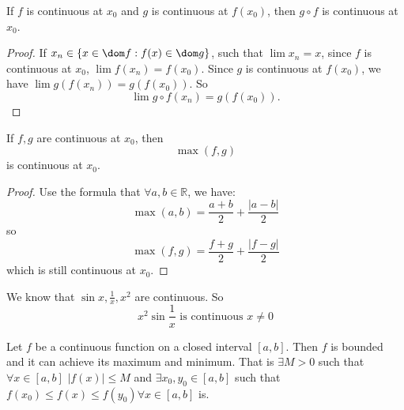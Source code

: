 \documentclass{report}
\begin{document}
\begin{theorem}{}
    If $f$ is continuous at $x_{0}$ and $g$ is continuous at $f(x_{0})$, then $g \circ f$ is continuous at $x_{0}$.
\end{theorem}
    \begin{proof}
        If $x_{n} \in \{x \in \dom f: f(x) \in \dom g\}$, such that $\lim  x_{n} = x$, since $f$ is continuous at $x_{0}$, $\lim f(x_{n}) = f(x_{0})$. Since $g$ is continuous at $f(x_{0})$, we have $\lim g(f(x_{n})) = g(f(x_{0}))$. So 
            \begin{equation*}
                \lim g \circ f(x_{n}) = g(f(x_{0})).
            \end{equation*}
    \end{proof}

\begin{examples}
    \begin{example}
        If $f, g$ are continuous at $x_{0}$, then
            \begin{equation*}
                \max(f, g)
            \end{equation*}
        is continuous at $x_{0}$.
            \begin{proof}
                Use the formula that $\forall a, b \in \mathbb{R}$, we have:
                    \begin{equation*}
                        \max(a, b) = \dfrac{a + b}{2} + \dfrac{\lvert a - b \rvert}{2}
                    \end{equation*}
                so
                    \begin{equation*}
                        \max(f, g) = \dfrac{f + g}{2} + \dfrac{\lvert f - g \rvert}{2}
                    \end{equation*}
                which is still continuous at $x_{0}$.
            \end{proof}
    \end{example}
    \begin{example}
        We know that $\sin{x}, \frac{1}{x}, x^{2}$ are continuous. So
            \begin{equation*}
                x^{2}\sin{\dfrac{1}{x}} \text{ is continuous $x \neq 0$}
            \end{equation*}
    \end{example}
\end{examples}

\begin{theorem}{18.1}
    Let $f$ be a continuous function on a closed interval $[a, b]$. Then $f$ is bounded and it can achieve its maximum and minimum. That is $\exists M> 0$ such that $\forall x \in [a, b]$ $\lvert f(x) \rvert \leq M$ and $\exists x_{0}, y_{0} \in [a, b]$ such that $f(x_{0}) \leq f(x) \leq f(y_{0}) \forall x\in [a, b]$ is.
\end{theorem}
\end{document}
